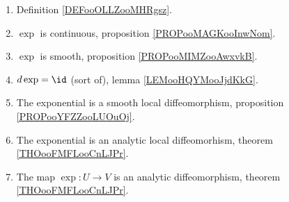 
\begin{enumerate}
	\item
	      Definition \ref{DEFooOLLZooMHRgsz}.
      \item
          \( \exp\) is continuous, proposition \ref{PROPooMAGKooInwNom}.
      \item
          \( \exp\) is smooth, proposition \ref{PROPooMIMZooAwxvkB}.
      \item
          \( d\exp=\id\) (sort of), lemma \ref{LEMooHQYMooJjdKkG}.
	\item
	      The exponential is a smooth local diffeomorphism, proposition \ref{PROPooYFZZooLUOuOj}.
	\item
	      The exponential is an analytic local diffeomorhism, theorem \ref{THOooFMFLooCnLJPr}.
	\item
	      The map \( \exp\colon U\to V\) is an analytic diffeomorphism, theorem \ref{THOooFMFLooCnLJPr}.
\end{enumerate}
